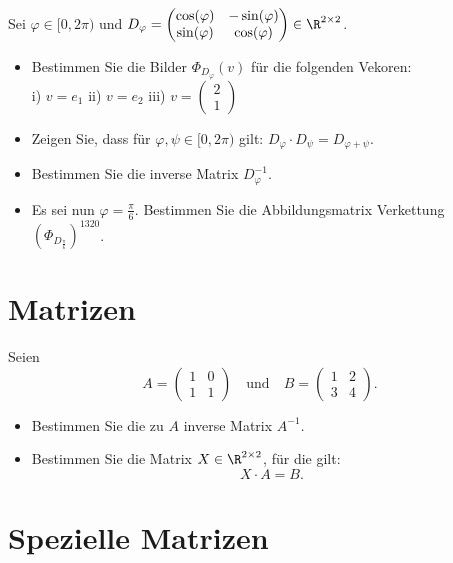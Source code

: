 Sei $\varphi \in [0,2\pi)$ und 
$
	D_\varphi=\begin{pmatrix}
		\cos(\varphi)	&-\sin(\varphi)	\\
		\sin(\varphi)	&\cos(\varphi)
	\end{pmatrix}
	\in \R^{2\times 2}$.
\begin{itemize}
\item[a)] Bestimmen Sie die Bilder $\Phi_{D_\varphi}(v)$ für die folgenden Vekoren:\\
i) $v=e_1$ \quad ii) $v=e_2$ \quad iii) $v=\begin{pmatrix} 2 \\ 1 \end{pmatrix}$
\item[b)] Zeigen Sie, dass für $\varphi, \psi \in [0,2\pi)$ gilt: $D_\varphi \cdot D_\psi = D_{\varphi+\psi}$.
\item[c)] Bestimmen Sie die inverse Matrix $D_\varphi^{-1}$.
\item[d)] Es sei nun $\varphi=\frac{\pi}{6}$. Bestimmen Sie die Abbildungsmatrix Verkettung $(\Phi_{D_{\frac{\pi}{6}}})^{1320}$.
\end{itemize}
\section{Matrizen}

Seien
$$
	A
	=
	\begin{pmatrix}
		1	&0	\\
		1	&1	
	\end{pmatrix}
	\quad
	\text{und}
	\quad
	B
	=
	\begin{pmatrix}
		1	&2	\\
		3	&4	
	\end{pmatrix}.
$$

\begin{itemize}
	\item[(a)] Bestimmen Sie die zu $A$ inverse Matrix $A^{-1}$. 
	\item[(b)] Bestimmen Sie die Matrix $X\in \R^{2\times 2}$, f\"ur die gilt:
		$$
			X\cdot A = B.
		$$
\end{itemize}

\newpage
\section{Spezielle Matrizen}


